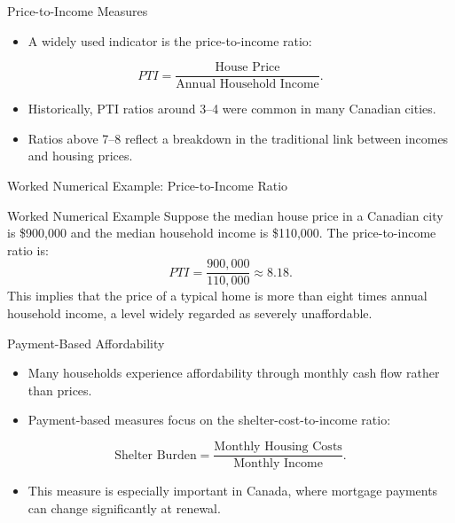 \documentclass[aspectratio=169]{beamer}
\begin{document}
\begin{frame}{Price-to-Income Measures}
\transfade
\begin{itemize}[<+->]
  \item A widely used indicator is the price-to-income ratio:
\end{itemize}

\vspace{0.2cm}
\[
PTI = \frac{\text{House Price}}{\text{Annual Household Income}}.
\]

\vspace{0.2cm}
\begin{itemize}[<+->]
  \item Historically, PTI ratios around 3--4 were common in many Canadian cities.
  \item Ratios above 7--8 reflect a breakdown in the traditional link between incomes and housing prices.
\end{itemize}
\end{frame}

\begin{frame}{Worked Numerical Example: Price-to-Income Ratio}
\transfade
\begin{block}{Worked Numerical Example}
Suppose the median house price in a Canadian city is \$900{,}000 and the median household income is \$110{,}000. The price-to-income ratio is:
\[
PTI = \frac{900{,}000}{110{,}000} \approx 8.18.
\]
This implies that the price of a typical home is more than eight times annual household income, a level widely regarded as severely unaffordable.
\end{block}
\end{frame}

\begin{frame}{Payment-Based Affordability}
\transfade
\begin{itemize}[<+->]
  \item Many households experience affordability through monthly cash flow rather than prices.
  \item Payment-based measures focus on the shelter-cost-to-income ratio:
\end{itemize}

\vspace{0.2cm}
\[
\text{Shelter Burden} = \frac{\text{Monthly Housing Costs}}{\text{Monthly Income}}.
\]

\vspace{0.2cm}
\begin{itemize}[<+->]
  \item This measure is especially important in Canada, where mortgage payments can change significantly at renewal.
\end{itemize}
\end{frame}
\end{document}
